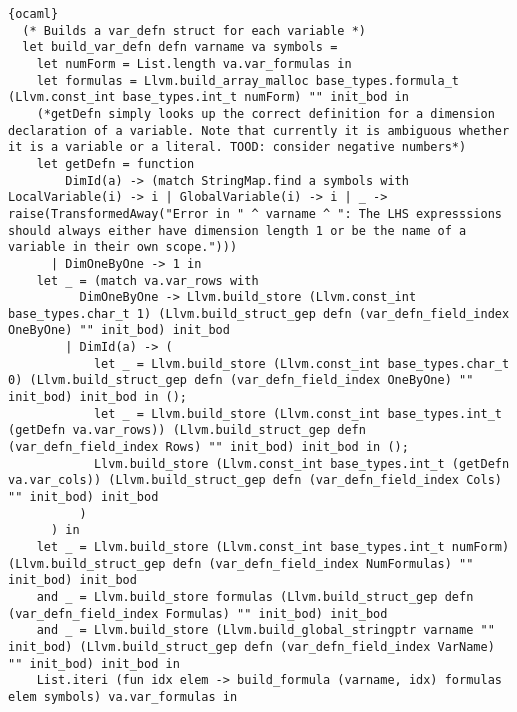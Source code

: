 \begin{lstlisting}{ocaml}
  (* Builds a var_defn struct for each variable *)
  let build_var_defn defn varname va symbols =
    let numForm = List.length va.var_formulas in
    let formulas = Llvm.build_array_malloc base_types.formula_t (Llvm.const_int base_types.int_t numForm) "" init_bod in
    (*getDefn simply looks up the correct definition for a dimension declaration of a variable. Note that currently it is ambiguous whether it is a variable or a literal. TOOD: consider negative numbers*)
    let getDefn = function
        DimId(a) -> (match StringMap.find a symbols with LocalVariable(i) -> i | GlobalVariable(i) -> i | _ -> raise(TransformedAway("Error in " ^ varname ^ ": The LHS expresssions should always either have dimension length 1 or be the name of a variable in their own scope.")))
      | DimOneByOne -> 1 in
    let _ = (match va.var_rows with
          DimOneByOne -> Llvm.build_store (Llvm.const_int base_types.char_t 1) (Llvm.build_struct_gep defn (var_defn_field_index OneByOne) "" init_bod) init_bod
        | DimId(a) -> (
            let _ = Llvm.build_store (Llvm.const_int base_types.char_t 0) (Llvm.build_struct_gep defn (var_defn_field_index OneByOne) "" init_bod) init_bod in ();
            let _ = Llvm.build_store (Llvm.const_int base_types.int_t (getDefn va.var_rows)) (Llvm.build_struct_gep defn (var_defn_field_index Rows) "" init_bod) init_bod in ();
            Llvm.build_store (Llvm.const_int base_types.int_t (getDefn va.var_cols)) (Llvm.build_struct_gep defn (var_defn_field_index Cols) "" init_bod) init_bod
          )
      ) in
    let _ = Llvm.build_store (Llvm.const_int base_types.int_t numForm) (Llvm.build_struct_gep defn (var_defn_field_index NumFormulas) "" init_bod) init_bod
    and _ = Llvm.build_store formulas (Llvm.build_struct_gep defn (var_defn_field_index Formulas) "" init_bod) init_bod
    and _ = Llvm.build_store (Llvm.build_global_stringptr varname "" init_bod) (Llvm.build_struct_gep defn (var_defn_field_index VarName) "" init_bod) init_bod in
    List.iteri (fun idx elem -> build_formula (varname, idx) formulas elem symbols) va.var_formulas in


\end{lstlisting}

